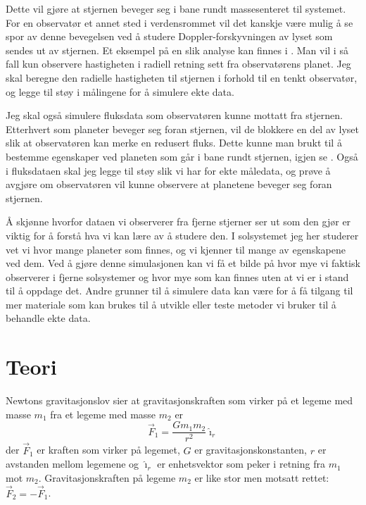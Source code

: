 \documentclass[reprint, english,notitlepage]{revtex4-1}  %
\begin{document}
Dette vil gjøre at stjernen beveger seg i bane rundt massesenteret til systemet. For en observatør et annet sted i verdensrommet vil det kanskje være mulig å se spor av denne bevegelsen ved å studere Doppler-forskyvningen av lyset som sendes ut av stjernen. Et eksempel på en slik analyse kan finnes i \citep{paper1C}. Man vil i så fall kun observere hastigheten i radiell retning sett fra observatørens planet. Jeg skal beregne den radielle hastigheten til stjernen i forhold til en tenkt observatør, og legge til støy i målingene for å simulere ekte data.

Jeg skal også simulere fluksdata som observatøren kunne mottatt fra stjernen. Etterhvert som planeter beveger seg foran stjernen, vil de blokkere en del av lyset slik at observatøren kan merke en redusert fluks. Dette kunne man brukt til å bestemme egenskaper ved planeten som går i bane rundt stjernen, igjen se \citep{paper1C}. Også i fluksdataen skal jeg legge til støy slik vi har for ekte måledata, og prøve å avgjøre om observatøren vil kunne observere at planetene beveger seg foran stjernen.

Å skjønne hvorfor dataen vi observerer fra fjerne stjerner ser ut som den gjør er viktig for å forstå hva vi kan lære av å studere den. I solsystemet jeg her studerer vet vi hvor mange planeter som finnes, og vi kjenner til mange av egenskapene ved dem. Ved å gjøre denne simulasjonen kan vi få et bilde på hvor mye vi faktisk observerer i fjerne solsystemer og hvor mye som kan finnes uten at vi er i stand til å oppdage det. Andre grunner til å simulere data kan være for å få tilgang til mer materiale som kan brukes til å utvikle eller teste metoder vi bruker til å behandle ekte data.



\section{Teori}

Newtons gravitasjonslov sier at gravitasjonskraften som virker på et legeme med masse $m_1$ fra
 et legeme med masse $m_2$ er
 \begin{equation}
   \label{eq:NGrav}
   \vec{F}_1 = \frac{G m_1 m_2}{r^2} \hat{\imath}_r
 \end{equation}
 der $\vec{F}_1$ er kraften som virker på legemet, $G$ er gravitasjonskonstanten, $r$ er avstanden mellom legemene og $\hat{\imath}_r$ er enhetsvektor som peker i retning fra $m_1$ mot $m_2$. Gravitasjonskraften på legeme $m_2$ er like stor men motsatt rettet: $\vec{F}_2 = -\vec{F}_1$.
\end{document}
